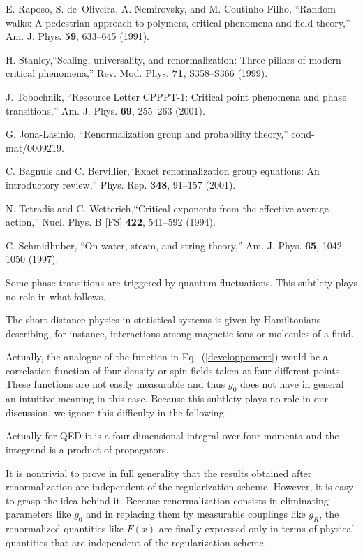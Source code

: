 \documentclass[floatfix,twocolumn,preprintnumbers,amsmath,amssymb,prb]{revtex4}
\begin{document}
{{\begin{thebibliography}{10}
E. Raposo, S. de~Oliveira, A. Nemirovsky, and M.
Coutinho-Filho, ``Random walks: A pedestrian approach to polymers,
critical phenomena and field theory,'' Am. J. Phys. \textbf{59},
633--645 (1991).

 H. Stanley,``Scaling, universality, and
renormalization: Three pillars of modern critical phenomena,'' Rev.
Mod. Phys. \textbf{71}, S358--S366 (1999).

J. Tobochnik, ``Resource Letter CPPPT-1:
Critical point phenomena and phase transitions,'' Am. J. Phys.
\textbf{69}, 255--263 (2001).

G. Jona-Lasinio, ``Renormalization group
and probability theory,'' cond-mat/0009219.

C. Bagnuls and C. Bervillier,``Exact
renormalization group equations: An introductory review,'' Phys.
Rep. \textbf{348}, 91--157 (2001).

 N. Tetradis and C. Wetterich,``Critical
exponents from the effective average action,'' Nucl. Phys. B [FS]
\textbf{422}, 541--592 (1994).

 C. Schmidhuber, ``On water, steam, and
string theory,'' Am. J. Phys. \textbf{65}, 1042--1050 (1997).

Some phase transitions are triggered by quantum
fluctuations. This subtlety plays no role in what follows.

The short distance physics in statistical systems
is given by Hamiltonians describing, for instance, interactions
among magnetic ions or molecules of a fluid. 

 Actually, the analogue of the function in
Eq.~(\ref{developpement}) would be a correlation function of four
density or spin fields taken at four different points. These 
functions are not easily measurable and thus $g_0$ does not have in
general an intuitive meaning in this case. Because this subtlety 
plays no role in our discussion, we ignore this
difficulty in the following.

Actually for QED it is a
four-dimensional integral over four-momenta and the integrand is a
product of propagators.

It is nontrivial to prove in full generality that
the results obtained after renormalization are independent of the
regularization scheme. However, it is easy to grasp the idea behind
it. Because renormalization consists in eliminating parameters like
$g_0$ and in replacing them by measurable couplings like $g_R$, the
renormalized quantities like $F(x)$ are finally expressed only in
terms of physical quantities that are independent of the
regularization scheme.\cite{gosdzinsky91}


\end{thebibliography}}}
\end{document}
